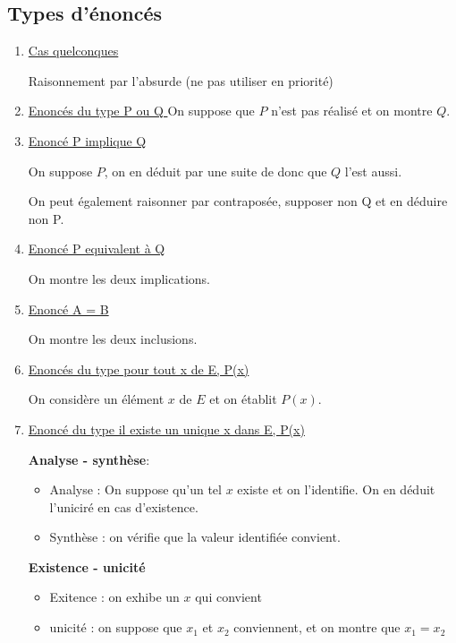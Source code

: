 \subsection{Types d'énoncés}\begin{enumerate}
	\item\ul{Cas quelconques}

Raisonnement par l'absurde (ne pas utiliser en priorité)\\

\item\ul{Enoncés du type P ou Q }
On suppose que $P$ n'est pas réalisé et on montre $Q$.\\

\item\ul{Enoncé P implique Q}

On suppose $P$, on en déduit par une suite de donc que $Q$ l'est aussi.

On peut également raisonner par contraposée, supposer non Q et en déduire non P.\\

\item\ul{Enoncé P equivalent à Q }

On montre les deux implications.\\

\item\ul{Enoncé A = B }

On montre les deux inclusions.\\

\item\ul{Enoncés du type pour tout x de E, P(x)}

On considère un élément $x$ de $E$ et on établit $P(x)$.\\

\item\ul{Enoncé du type il existe un unique x dans E, P(x)}

\textbf{Analyse - synthèse}:
\begin{itemize}
    \item Analyse : On suppose qu'un tel $x$ existe et on l'identifie. On en 
        déduit l'uniciré en cas d'existence. 
    \item Synthèse : on vérifie que la valeur identifiée convient. 
\end{itemize}


\textbf{Existence - unicité}
\begin{itemize}
    \item Exitence : on exhibe un $x$ qui convient
    \item unicité : on suppose que $x_1$ et $x_2$ conviennent, et on montre que 
        $x_1 = x_2$\\
\end{itemize}


\end{enumerate}
